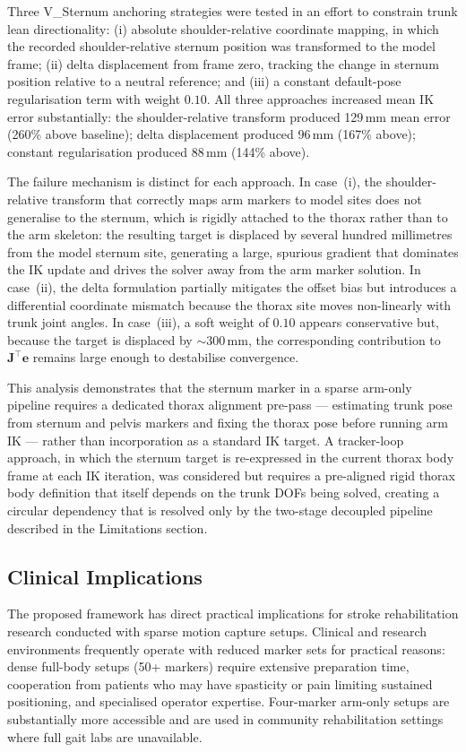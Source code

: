 \documentclass[journal,10pt,twocolumn]{IEEEtran}
\begin{document}
Three V\_Sternum anchoring strategies were tested in an effort to constrain
trunk lean directionality: (i) absolute shoulder-relative coordinate mapping,
in which the recorded shoulder-relative sternum position was transformed to
the model frame; (ii) delta displacement from frame zero, tracking the
change in sternum position relative to a neutral reference; and (iii) a
constant default-pose regularisation term with weight $0.10$.
All three approaches increased mean IK error substantially: the
shoulder-relative transform produced 129\,mm mean error (260\% above
baseline); delta displacement produced 96\,mm (167\% above); constant
regularisation produced 88\,mm (144\% above).

The failure mechanism is distinct for each approach. In case~(i), the
shoulder-relative transform that correctly maps arm markers to model sites
does not generalise to the sternum, which is rigidly attached to the thorax
rather than to the arm skeleton: the resulting target is displaced by
several hundred millimetres from the model sternum site, generating a
large, spurious gradient that dominates the IK update and drives the solver
away from the arm marker solution. In case~(ii), the delta formulation
partially mitigates the offset bias but introduces a differential coordinate
mismatch because the thorax site moves non-linearly with trunk joint angles.
In case~(iii), a soft weight of $0.10$ appears conservative but, because
the target is displaced by $\sim$300\,mm, the corresponding contribution to
$\mathbf{J}^\top\mathbf{e}$ remains large enough to destabilise convergence.

This analysis demonstrates that the sternum marker in a sparse arm-only
pipeline requires a dedicated thorax alignment pre-pass --- estimating trunk
pose from sternum and pelvis markers and fixing the thorax pose before running
arm IK --- rather than incorporation as a standard IK target.
A tracker-loop approach, in which the sternum target is re-expressed in the
current thorax body frame at each IK iteration, was considered but requires a
pre-aligned rigid thorax body definition that itself depends on the trunk DOFs
being solved, creating a circular dependency that is resolved only by the
two-stage decoupled pipeline described in the Limitations section.

\subsection{Clinical Implications}

The proposed framework has direct practical implications for stroke
rehabilitation research conducted with sparse motion capture setups.
Clinical and research environments frequently operate with reduced
marker sets for practical reasons: dense full-body setups (50+ markers)
require extensive preparation time, cooperation from patients who may
have spasticity or pain limiting sustained positioning, and specialised
operator expertise. Four-marker arm-only setups are substantially more
accessible and are used in community rehabilitation settings where
full gait labs are unavailable.
\end{document}

